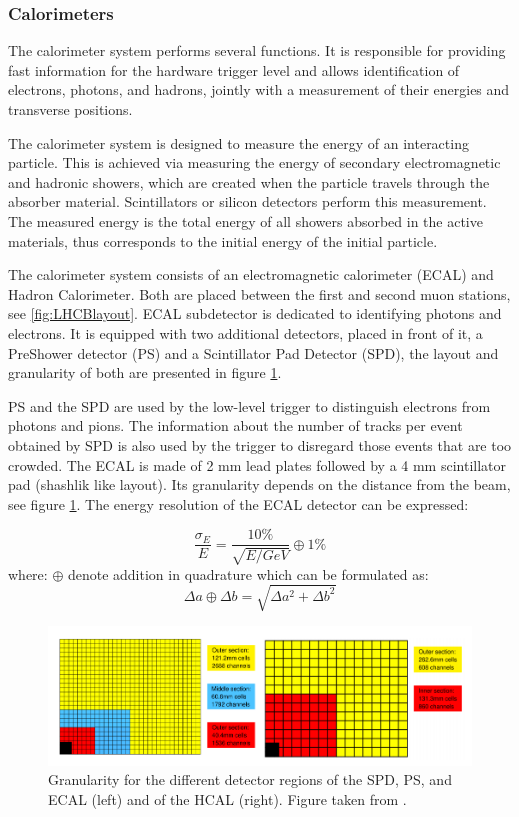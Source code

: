 \subsubsection{Calorimeters}

The calorimeter system performs several functions. It is responsible for providing fast information for the hardware trigger level and allows identification of electrons, photons, and hadrons, jointly with a measurement of their energies and transverse positions.

The calorimeter system is designed to measure the energy of an interacting particle. This is achieved via measuring the energy of secondary electromagnetic and hadronic showers, which are created when the particle travels through the absorber material. Scintillators or silicon detectors perform this measurement. The measured energy is the total energy of all showers absorbed in the active materials, thus corresponds to the initial energy of the initial particle. 

The calorimeter system consists of an electromagnetic calorimeter (ECAL) and Hadron Calorimeter.  Both are placed between the first and second muon stations, see \ref{fig:LHCBlayout}. ECAL subdetector is dedicated to identifying photons and electrons.  It is equipped with two additional detectors, placed in front of it, a PreShower detector (PS) and a Scintillator Pad Detector (SPD), the layout and granularity of both are presented in figure \ref{fig:ECAL}. 


PS and the SPD are used by the low-level trigger to distinguish electrons from photons and pions. The information about the number of tracks per event obtained by SPD is also used by the trigger to disregard those events that are too crowded. 
The ECAL is made of 2 mm lead plates followed by a 4 mm scintillator pad (shashlik like layout).  Its granularity depends on the distance from the beam, see figure \ref{fig:ECAL}.
The energy resolution of the ECAL detector can be expressed: 

\begin{equation}
    \frac{\sigma_{E}}{E} = \frac{10\%}{\sqrt{E/GeV}} \oplus     1 \%
\end{equation}
where: $\oplus $ denote addition in quadrature which can be formulated as: 
\begin{equation}
   \Delta a\oplus \Delta b = \sqrt{\Delta a^2 + \Delta b^2} 
\end{equation}


\begin{figure}
\centering
\includegraphics[width=\linewidth]{figures/ECAL.PNG}
\caption{Granularity for the different detector regions of the SPD, PS, and ECAL (left)
and of the HCAL (right). Figure taken from \cite{lhcb}.
\label{fig:ECAL}}
\end{figure}

